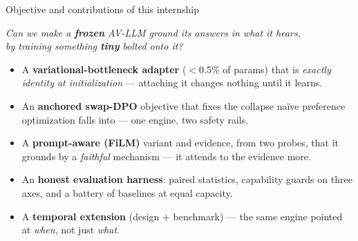 \documentclass[aspectratio=169,11pt]{beamer}
\begin{document}
\begin{frame}{Objective and contributions of this internship}
\begin{center}\large\itshape
Can we make a \textbf{frozen} AV-LLM ground its answers in what it hears,\\[2pt]
by training something \textbf{tiny} bolted onto it?
\end{center}
\vspace{0.3em}
\begin{itemize}\small
\item[\textbf{C1}] A \textbf{variational-bottleneck adapter} ($<$0.5\% of params) that is \emph{exactly
identity at initialization} --- attaching it changes nothing until it learns.
\item[\textbf{C2}] An \textbf{anchored swap-DPO} objective that fixes the collapse naïve preference
optimization falls into --- one engine, two safety rails.
\item[\textbf{C3}] A \textbf{prompt-aware (FiLM)} variant and evidence, from two probes, that it grounds
by a \emph{faithful} mechanism --- it attends to the evidence more.
\item[\textbf{C4}] An \textbf{honest evaluation harness}: paired statistics, capability guards on three
axes, and a battery of baselines at equal capacity.
\item[\textbf{C5}] A \textbf{temporal extension} (design $+$ benchmark) --- the same engine pointed at
\emph{when}, not just \emph{what}.
\end{itemize}
\end{frame}

\end{document}
